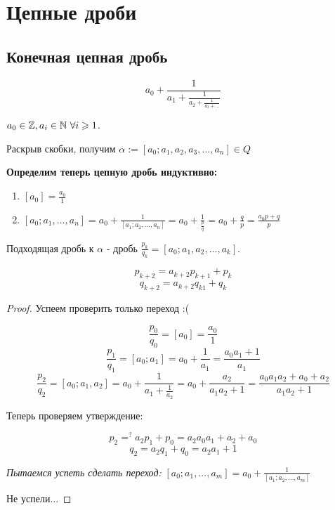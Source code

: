 \section{Цепные дроби}

\subsection{Конечная цепная дробь}

$$a_0 + \frac{1}{a_1 + \frac{1}{a_2 + \frac{1}{a_3 + ...}}}$$

$a_0 \in \mathbb{Z}, a_i \in \mathbb{N} \ \forall i \geqslant 1$.

Раскрыв скобки, получим $\alpha := [a_0; a_1, a_2, a_3, \dots, a_n] \in Q$

\textbf{Определим теперь цепную дробь индуктивно:}

\begin{enumerate}
  \item $[a_0] = \frac{a_0}{1}$
  \item $[a_0; a_1, \dots, a_n] = a_0 + \frac{1}{[a_1; a_2, \dots, a_n]} = a_0 + \frac{1}{\frac{p}{q}} = a_0 + \frac{q}{p} = \frac{a_0 p + q}{p}$
\end{enumerate}

\begin{definition}
  Подходящая дробь к $\alpha$ - дробь $\frac{p_k}{q_k} = [a_0; a_1, a_2, ..., a_k]$.
\end{definition}

\begin{theorem}
  $$p_{k + 2} = a_{k + 2} p_{k + 1} + p_k$$
  $$q_{k + 2} = a_{k + 2} q_{k 1} + q_k$$
\end{theorem}

\begin{proof}
  Успеем проверить только переход :(

 $$ \frac{p_0}{q_0} = [a_0] = \frac{a_0}{1}$$
$$\frac{p_1}{q_1} = [a_0; a_1] = a_0 + \frac{1}{a_1} = \frac{a_0 a_1 + 1}{a_1}$$
$$\frac{p_2}{q_2} = [a_0; a_1, a_2] = a_0 + \frac{1}{a_1 + \frac{1}{a_2}} = a_0 + \frac{a_2}{a_1 a_2 + 1} = \frac{a_0 a_1 a_2 + a_0 + a_2}{a_1 a_2 + 1}$$

Теперь проверяем утверждение:

$$p_2 =^{?} a_2 p_1 + p_0 = a_2 a_0 a_1 + a_2 + a_0$$
$$q_2 = a_2 q_1 + q_0 = a_2 a_1 + 1$$

\textit{Пытаемся успеть сделать переход:}
$[a_0; a_1, ..., a_m] = a_0 + \frac{1}{[a_1; a_2, ..., a_m]}$


Не успели...
\end{proof}

